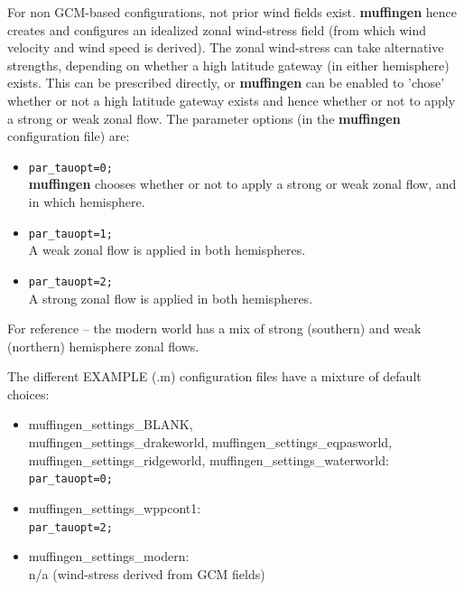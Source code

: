 \documentclass[11pt,fleqn]{book} %
\begin{document}
For non GCM-based configurations, not prior wind fields exist. \textbf{muffingen} hence creates and configures an idealized zonal wind-stress field (from which wind velocity and wind speed is derived). The zonal wind-stress can take alternative strengths, depending on whether a high latitude gateway (in either hemisphere) exists. This can be prescribed directly, or \textbf{muffingen} can be enabled to 'chose' whether or not a high latitude gateway exists and hence whether or not to apply a strong or weak zonal flow. The parameter options (in the \textbf{muffingen} configuration file) are:

\begin{itemize}
\item \texttt{par\_tauopt=0;}
\\\textbf{muffingen} chooses whether or not to apply a strong or weak zonal flow, and in which hemisphere.
\item \texttt{par\_tauopt=1;}
\\A weak zonal flow is applied in both hemispheres.
\item \texttt{par\_tauopt=2;}
\\A strong zonal flow is applied in both hemispheres.
\end{itemize} 

For reference -- the modern world has a mix of strong (southern) and weak (northern) hemisphere zonal flows.

The different EXAMPLE (\small\textsf{.m}\normalsize) configuration files have a mixture of default choices:

\begin{itemize}
\item \small\textsf{muffingen\_settings\_BLANK}\normalsize, 
\\\small\textsf{muffingen\_settings\_drakeworld}\normalsize, 
\small\textsf{muffingen\_settings\_eqpasworld}\normalsize, 
\\\small\textsf{muffingen\_settings\_ridgeworld}\normalsize, 
\small\textsf{muffingen\_settings\_waterworld}\normalsize:
\\\texttt{par\_tauopt=0;}
\item \small\textsf{muffingen\_settings\_wppcont1}\normalsize:
\\\texttt{par\_tauopt=2;}
\item \small\textsf{muffingen\_settings\_modern}\normalsize:
\\n/a (wind-stress derived from GCM fields)
\end{itemize}
\end{document}
